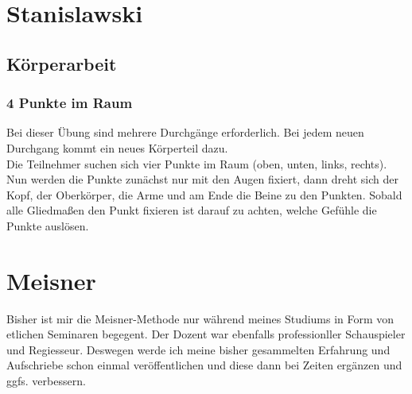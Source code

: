 \documentclass[ngerman, a4paper, twoside]{scrbook}%
\begin{document}
	\newpage

	\chapter{Stanislawski}
	\section{Körperarbeit}
	\subsection{4 Punkte im Raum}
	Bei dieser Übung sind mehrere Durchgänge erforderlich. Bei jedem neuen Durchgang kommt ein neues Körperteil dazu. \\
	Die Teilnehmer suchen sich vier Punkte im Raum (oben, unten, links, rechts). Nun werden die Punkte zunächst nur mit den Augen fixiert, dann dreht sich der Kopf, der Oberkörper, die Arme und am Ende die Beine zu den Punkten. Sobald alle Gliedmaßen den Punkt fixieren ist darauf zu achten, welche Gefühle die Punkte auslösen.



	\chapter{Meisner} %
	Bisher ist mir die Meisner-Methode nur während meines Studiums in Form von etlichen Seminaren begegent. Der Dozent war ebenfalls professionller Schauspieler und Regiesseur. Deswegen werde ich meine bisher gesammelten Erfahrung und Aufschriebe schon einmal veröffentlichen und diese dann bei Zeiten ergänzen und ggfs. verbessern.\\
	\vspace{1cm}
\end{document}

